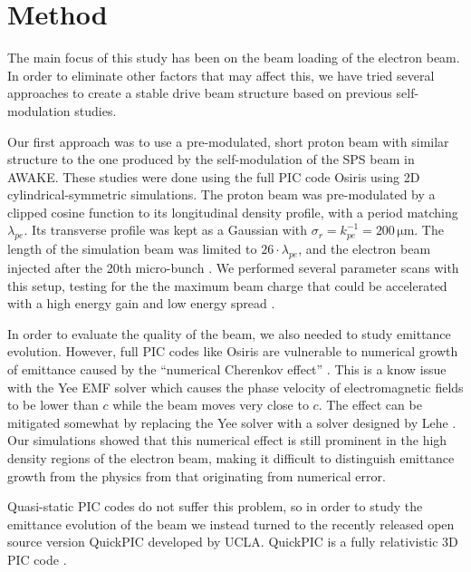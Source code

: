 \documentclass[aps,prstab,reprint,amsmath,amssymb,groupedaddress]{revtex4-1}
\newcommand{\unit}[1]{\,\mathrm{#1}}
\begin{document}
\section[\label{S:M}]{Method}

The main focus of this study has been on the beam loading of the electron beam. In order to eliminate other factors that
may affect this, we have tried several approaches to create a stable drive beam structure based on previous self-
modulation studies.

Our first approach was to use a pre-modulated, short proton beam with similar structure to the one produced by the
self-modulation of the SPS beam in AWAKE. These studies were done using the full PIC code Osiris \cite{fonseca:2002}
using 2D cylindrical-symmetric simulations. The proton beam was pre-modulated by a clipped cosine function to its
longitudinal density profile, with a period matching $\lambda_{pe}$. Its transverse profile was kept as a Gaussian with
$\sigma_{r} = k_{pe}^{-1} = 200\unit{\mu m}$. The length of the simulation beam was limited to $26\cdot\lambda_{pe}$,
and the electron beam injected after the 20th micro-bunch \cite{berglyd_olsen:2015}. We performed several parameter
scans with this setup, testing for the the maximum beam charge that could be accelerated with a high energy gain and low
energy spread \cite{adli:2016, berglyd_olsen:2016}.

In order to evaluate the quality of the beam, we also needed to study emittance evolution. However, full PIC codes like
Osiris are vulnerable to numerical growth of emittance caused by the ``numerical Cherenkov effect'' \cite{godfrey:1974}.
This is a know issue with the Yee EMF solver which causes the phase velocity of electromagnetic fields to be lower than
$c$ while the beam moves very close to $c$. The effect can be mitigated somewhat by replacing the Yee solver with a
solver designed by Lehe \cite{lehe:2013}. Our simulations showed that this numerical effect is still prominent in the
high density regions of the electron beam, making it difficult to distinguish emittance growth from the physics from
that originating from numerical error.

Quasi-static PIC codes do not suffer this problem, so in order to study the emittance evolution of the beam we instead
turned to the recently released open source version QuickPIC developed by UCLA. QuickPIC is a fully relativistic 3D PIC
code \cite{huang:2006, an:2013}.
\end{document}
